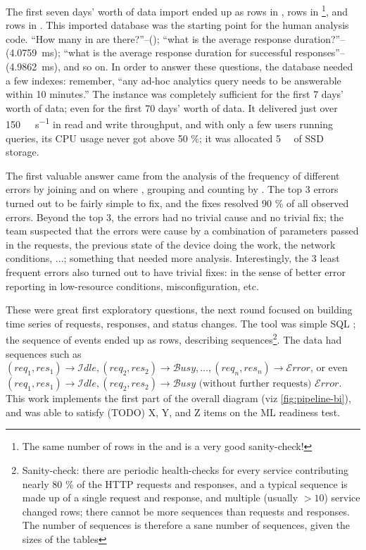 The first seven days' worth of data import ended up as  rows in ,  rows in \footnote{The same number of rows in the  and  is a very good sanity-check!}, and  rows in . This imported database was the starting point for the human analysis code. ``How many  in  are there?''--(); ``what is the average response duration?''--(\SI{4.0759}{\milli\second}); ``what is the average response duration for successful responses''--(\SI{4.9862}{\milli\second}), and so on. In order to answer these questions, the database needed a few indexes: remember, ``any ad-hoc analytics query needs to be answerable within 10 minutes.'' The  instance was completely sufficient for the first 7 days' worth of data; even for the first 70 days' worth of data. It delivered just over \SI{150}{\mebi\byte\per\second} in read and write throughput, and with only a few users running queries, its CPU usage never got above 50 \%; it was allocated \SI{5}{\tebi\byte} of SSD storage. 

The first valuable answer came from the analysis of the frequency of different errors by joining  and  on  where , grouping and counting by . The top 3 errors turned out to be fairly simple to fix, and the fixes resolved 90 \% of all observed errors. Beyond the top 3, the errors had no trivial cause and no trivial fix; the team suspected that the errors were cause by a combination of parameters passed in the requests, the previous state of the device doing the work, the network conditions, ...; something that needed more analysis. Interestingly, the 3 least frequent errors also turned out to have trivial fixes: in the sense of better error reporting in low-resource conditions, misconfiguration, etc.

These were great first exploratory questions, the next round focused on building time series of requests, responses, and status changes. The tool was simple SQL ; the sequence of events ended up as  rows, describing  sequences\footnote{Sanity-check: there are periodic health-checks for every service contributing nearly 80 \% of the HTTP requests and responses, and a typical sequence is made up of a single request and response, and multiple (usually $> 10$) service changed rows; there cannot be more sequences than requests and responses. The  number of sequences is therefore a sane number of sequences, given the sizes of the tables}. The data had sequences such as $(req_1, res_1) \rightarrow \mathcal{I}dle, (req_2, res_2) \rightarrow \mathcal{B}usy, \ldots, (req_n, res_n) \rightarrow \mathcal{E}rror$, or even $(req_1, res_1) \rightarrow \mathcal{I}dle, (req_2, res_2) \rightarrow \mathcal{B}usy\text{ (without further requests) } \mathcal{E}rror$. This work implements the first part of the overall diagram (viz \autoref{fig:pipeline-bi}), and was able to satisfy (TODO) X, Y, and Z items on the ML readiness test.


